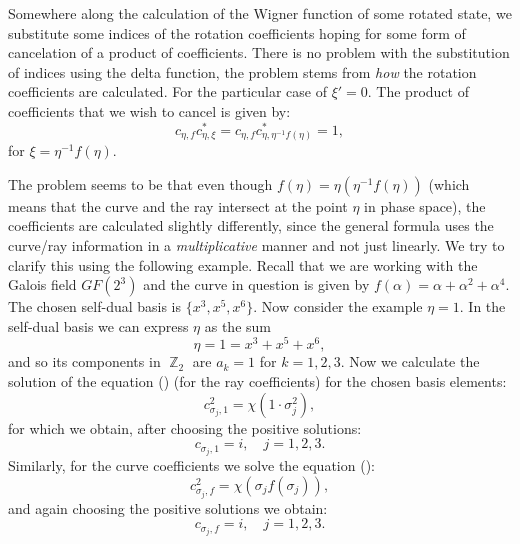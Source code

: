 \documentclass[a4paper]{article}
\DeclareMathOperator{\Z}{\mathbb{Z}}
\begin{document}
  Somewhere along the calculation of the Wigner function of
  some rotated state, we substitute some indices of the
  rotation coefficients hoping for some form of cancelation
  of a product of coefficients.  There is no problem with
  the substitution of indices using the delta function, the
  problem stems from \textit{how} the rotation coefficients
  are calculated.  For the particular case of $\xi' = 0$.
  The product of coefficients that we wish to cancel is
  given by:
  \begin{equation}
    c_{\eta,f} c_{\eta,\xi}^* 
    = c_{\eta,f} c_{\eta,\eta^{-1}f(\eta)}^* 
    = 1,
  \end{equation}
  for $\xi = \eta^{-1}f(\eta)$.

  The problem seems to be that even though $f(\eta) = \eta
  \left( \eta^{-1}f(\eta) \right)$ (which means that the
  curve and the ray intersect at the point $\eta$ in phase
  space), the coefficients are calculated slightly
  differently, since the general formula uses the curve/ray
  information in a \textit{multiplicative} manner and not
  just linearly. We try to clarify this using the following
  example. Recall that we are working with the Galois field
  $GF(2^3)$ and the curve in question is given by $f(\alpha)
  = \alpha + \alpha^2 + \alpha^4$. The chosen self-dual
  basis is $\{x^3, x^5, x^6\}$. Now consider the example
  $\eta = 1$.  In the self-dual basis we can express $\eta$
  as the sum 
  \begin{equation}
    \eta = 1 = x^3 + x^5 + x^6,
  \end{equation}
  and so its components in $\Z_2$ are $a_k = 1$ for
  $k=1,2,3$. Now we calculate the solution of the equation
  () (for the ray coefficients) for the chosen basis
  elements: 
  \begin{equation}
    c_{\sigma_j,1}^2
    = \chi(1 \cdot \sigma_j^2),
  \end{equation}
  for which we obtain, after choosing the
  positive solutions:
  \begin{equation}
    c_{\sigma_j,1} = i,
    \quad j = 1,2,3.
  \end{equation}
  Similarly, for the curve coefficients we solve the
  equation ():
  \begin{equation}
    c_{\sigma_j, f}^2
    = \chi(\sigma_j f(\sigma_j)),
  \end{equation}
  and again choosing the positive solutions we obtain:
  \begin{equation}
    c_{\sigma_j, f} = i,
    \quad j = 1,2,3.
  \end{equation}
\end{document}
